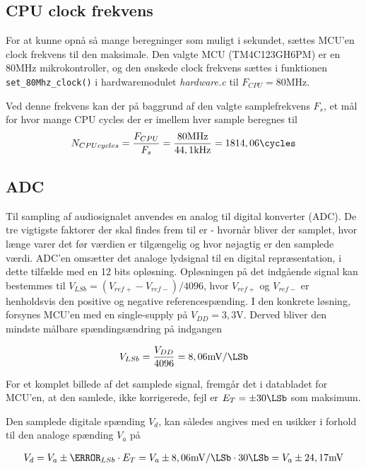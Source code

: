 \subsection{CPU clock frekvens}
For at kunne opnå så mange beregninger som muligt i sekundet, sættes MCU'en clock frekvens til den maksimale.
Den valgte MCU (TM4C123GH6PM) er en $80\si{\mega\hertz}$ mikrokontroller, og den ønskede clock frekvens sættes i funktionen \texttt{set\_80Mhz\_clock()} i hardwaremodulet \textit{hardware.c} til $F_{CPU} = 80\si{\mega\hertz}$. 

Ved denne frekvens kan der på baggrund af den valgte samplefrekvens $F_s$, et mål for hvor mange CPU cycles der er imellem hver sample beregnes til
\begin{align}
N_{CPU cycles} = \frac{F_{CPU}}{F_s}  =  \frac{80\si{\mega\hertz}}{44,1\si{\kilo\hertz}}  = 1814,06 \si{\cycles}
\end{align}

\subsection{ADC}
Til sampling af audiosignalet anvendes en analog til digital konverter (ADC). 
De tre vigtigste faktorer der skal findes frem til er - hvornår bliver der samplet, hvor længe varer det før værdien er tilgængelig og hvor nøjagtig er den samplede værdi.
ADC'en omsætter det analoge lydsignal til en digital repræsentation, i dette tilfælde med en 12 bits opløsning.
Opløsningen på det indgående signal kan bestemmes til $V_{LSb} = (V_{ref+} - V_{ref-} ) / 4096 $, hvor $V_{ref+}$ og $V_{ref-}$ er henholdsvis den positive og negative referencespænding.
I den konkrete løsning, forsynes MCU'en med en single-supply på $V_{DD} = 3,3\si{\volt}$.
Derved bliver den mindste målbare spændingsændring på indgangen

\begin{align}
V_{LSb} = \frac{V_{DD}}{4096} = 8,06\si{\milli\volt\per\LSb}
\end{align}

For et komplet billede af det samplede signal, fremgår det i databladet \cite[afsnit 24.14 s. 1383]{tm4c123gh6pm} for MCU'en, at
den samlede, ikke korrigerede, fejl er $E_T = \pm 30\si{\LSb}$ som maksimum.

Den samplede digitale spænding $V_{d}$, kan således angives med en usikker i forhold til den analoge spænding $V_{a}$ på

\begin{align}
V_{d} = V_{a} \pm \V_{LSb} \cdot E_T = V_{a} \pm   8,06\si{\milli\volt\per\LSb} \cdot 30 \si{\LSb} = V_{a} \pm 24,17\si{\milli\volt}
\end{align} 

